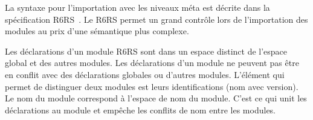 
La syntaxe pour l'importation avec les niveaux méta est décrite dans la
spécification R6RS~\cite{Scheme:R6RS}. Le  R6RS permet un grand
contrôle lors de l'importation des modules au prix d'une sémantique plus complexe.

Les déclarations d'un module R6RS sont dans un espace distinct de l'espace global et
des autres modules. Les déclarations d'un module ne peuvent pas être en conflit avec
des déclarations globales ou d'autres modules. L'élément qui permet de distinguer deux modules
est leurs identifications (nom avec version). Le nom du module correspond à l'espace de nom du module.
C'est ce qui unit les déclarations au module et empêche les conflits de nom entre
les modules.







